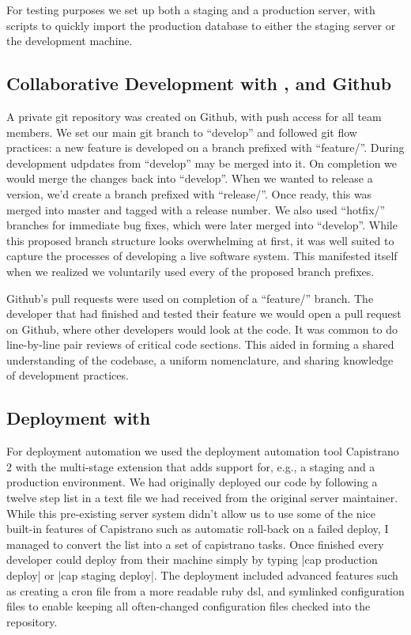 For testing purposes we set up both a staging and a production server, with scripts to quickly import the production database to either the staging server or the development machine.

\subsection{Collaborative Development with ,  and Github}

A private \gls{git} repository was created on Github, with push access for all team members. We set our main git branch to ``develop'' and followed git flow practices: a new feature is developed on a branch prefixed with ``feature/''. During development udpdates from ``develop'' may be merged into it. On completion we would merge the changes back into ``develop''. When we wanted to release a version, we'd create a branch prefixed with ``release/''. Once ready, this was merged into master and tagged with a release number. We also used ``hotfix/'' branches for immediate bug fixes, which were later merged into ``develop''. While this proposed branch structure looks overwhelming at first, it was well suited to capture the processes of developing a live software system. This manifested itself when we realized we voluntarily used every of the proposed branch prefixes.

Github's pull requests were used on completion of a ``feature/'' branch. The developer that had finished and tested their feature we would open a pull request on Github, where other developers would look at the code. It was common to do line-by-line pair reviews of critical code sections. This aided in forming a shared understanding of the codebase, a uniform nomenclature, and sharing knowledge of development practices.


\subsection{Deployment with }
\label{subsection:Deployment}

For deployment automation we used the deployment automation tool Capistrano 2 with the multi-stage extension that adds support for, e.g., a staging and a production environment. We had originally deployed our code by following a twelve step list in a text file we had received from the original server maintainer. While this pre-existing server system didn't allow us to use some of the nice built-in features of Capistrano such as automatic roll-back on a failed deploy, I managed to convert the list into a set of capistrano tasks. Once finished every developer could deploy from their machine simply by typing |cap production deploy| or |cap staging deploy|. The deployment included advanced features such as creating a \gls{cron} file from a more readable \gls{ruby} \gls{dsl}, and symlinked configuration files to enable keeping all often-changed configuration files checked into the repository.

